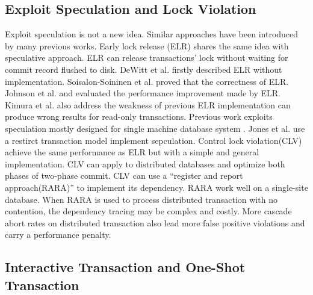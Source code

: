 \documentclass[conference]{IEEEtran}
\begin{document}
\subsection{Exploit Speculation and Lock Violation}
Exploit speculation is not a new idea.
Similar approaches have been introduced by many previous works.
Early lock release (ELR)
\cite{ELR:dewitt_implementation_1984}\cite{PS2PL:conf/icdt/Soisalon-SoininenY95}
\cite{Aether:journals/pvldb/JohnsonPSAA10}
\cite{EfficientLocking:conf/vldb/KimuraGK12}
\cite{Actor-Oriented-DB:conf/icde/Bernstein18}
shares the same idea with speculative approach. 
ELR can release transactions' lock without waiting for commit record flushed to disk.
DeWitt et al.\cite{ELR:dewitt_implementation_1984} firstly described ELR
 without implementation.
Soisalon-Soininen et al.\cite{PS2PL:conf/icdt/Soisalon-SoininenY95} proved that the correctness of ELR.
Johnson et al.\cite{Aether:journals/pvldb/JohnsonPSAA10} and\cite{EfficientLocking:conf/vldb/KimuraGK12} evaluated the performance improvement made by ELR.
Kimura et al.\cite{EfficientLocking:conf/vldb/KimuraGK12}\cite{Aether:journals/pvldb/JohnsonPSAA10} also address the weakness of previous ELR implementation\cite{ELR:dewitt_implementation_1984} can produce wrong results for read-only transactions.
Previous work exploits speculation mostly designed for single machine database system
\cite{PS2PL:conf/icdt/Soisalon-SoininenY95}
\cite{Aether:journals/pvldb/JohnsonPSAA10}
\cite{EfficientLocking:conf/vldb/KimuraGK12}.
Jones et al.\cite{LowOverheadCC:conf/sigmod/JonesAM10} use a restirct transaction model\cite{H-store:journals/pvldb/KallmanKNPRZJMSZHA08} implement sepculation.
Control lock violation(CLV)\cite{CLV:conf/sigmod/GraefeLKTV13} achieve the same performance as ELR but with a simple and general implementation.
CLV can apply to distributed databases and optimize both phases of two-phase commit.
CLV can use a ``register and report approach(RARA)''\cite{HeckatonMVCC:journals/pvldb/LarsonBDFPZ11} to implement its dependency.
RARA work well on a single-site database.
When RARA is used to process distributed transaction with no contention, the dependency tracing may be complex and costly.
More cascade abort rates on distributed transaction also lead more false positive violations and carry a performance penalty.

\subsection{Interactive Transaction and One-Shot Transaction}
\end{document}
